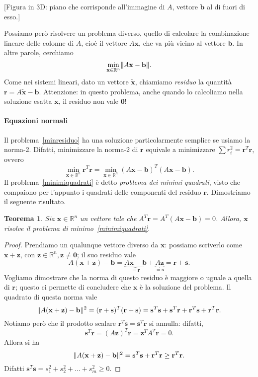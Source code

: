 \documentclass[a4paper]{report}
\DeclarePairedDelimiter{\norm}{\lVert}{\rVert}
\newtheorem{theorem}{Teorema}[chapter]
\theoremstyle{definiton}
\theoremstyle{remark}
\newcommand{\x}{\mathbf{x}}
\renewcommand{\b}{\mathbf{b}}
\begin{document}
[Figura in 3D: piano che corrisponde all'immagine di $A$, vettore $\b$ al di fuori di esso.]

Possiamo però risolvere un problema diverso, quello di calcolare la combinazione lineare delle colonne di $A$, cioè il vettore $A\x$, che va più vicino al vettore $\b$. In altre parole, cerchiamo 
\begin{equation} \label{minresiduo}
    \min_{\x\in\mathbb{R}^n} \norm{A\x-\b}.    
\end{equation}
Come nei sistemi lineari, dato un vettore $\tilde{\x}$, chiamiamo \emph{residuo} la quantità $\mathbf{r} = A \tilde{\x} - \b$. Attenzione: in questo problema, anche quando lo calcoliamo nella soluzione esatta $\x$, il residuo non vale $\mathbf{0}$!

\paragraph{Equazioni normali} Il problema~\eqref{minresiduo} ha una soluzione particolarmente semplice se usiamo la norma-2. Difatti, minimizzare la norma-2 di $\mathbf{r}$ equivale a minimizzare $\sum r_i^2  = \mathbf{r}^T\mathbf{r}$, ovvero
\begin{equation} \label{minimiquadrati}
    \min_{\x\in\mathbb{R}^n} \mathbf{r}^T \mathbf{r} = \min_{\x\in\mathbb{R}^n} (A\x-\b)^T(A\x-\b).    
\end{equation}
Il problema~\eqref{minimiquadrati} è detto \emph{problema dei minimi quadrati}, visto che compaiono per l'appunto i quadrati delle componenti del residuo $\mathbf{r}$. Dimostriamo il seguente risultato.
\begin{theorem}
Sia $\x\in\mathbb{R}^n$ un vettore tale che $A^T \mathbf{r} = A^T(A\x-\b) = 0$. Allora, $\x$ risolve il problema di minimo~\eqref{minimiquadrati}.
\end{theorem}
\begin{proof}
Prendiamo un qualunque vettore diverso da $\x$: possiamo scriverlo come $\x+\mathbf{z}$, con $\mathbf{z}\in\mathbb{R}^n, \mathbf{z} \neq \mathbf{0}$; il suo residuo vale
\[
A(\x+\mathbf{z})-\b = \underbrace{A\x-\b}_{=\mathbf{r}} + \underbrace{A\mathbf{z}}_{=\mathbf{s}} = \mathbf{r}+\mathbf{s}.
\]
Vogliamo dimostrare che la norma di questo residuo è maggiore o uguale a quella di $\mathbf{r}$; questo ci permette di concludere che $\x$ è la soluzione del problema. Il quadrato di questa norma vale
\[
\norm{A(\x+\mathbf{z})-\b}^2 = (\mathbf{r}+\mathbf{s})^T(\mathbf{r}+\mathbf{s}) = \mathbf{s}^T \mathbf{s} + \mathbf{s}^T\mathbf{r} + \mathbf{r}^T \mathbf{s} + \mathbf{r}^T \mathbf{r}.
\]
Notiamo però che il prodotto scalare $\mathbf{r}^T\mathbf{s} = \mathbf{s}^T\mathbf{r}$ si annulla: difatti,
\[
\mathbf{s}^T \mathbf{r} = (A\mathbf{z})^T \mathbf{r} = \mathbf{z}^T A^T \mathbf{r} = 0.
\]
Allora si ha
\[
\norm{A(\x+\mathbf{z})-\b}^2 = \mathbf{s}^T \mathbf{s} + \mathbf{r}^T \mathbf{r} \geq \mathbf{r}^T\mathbf{r}.
\]
Difatti $\mathbf{s}^T\mathbf{s} = s_1^2 + s_2^2 + \dots + s_m^2 \geq 0$.
\end{proof}
\end{document}
